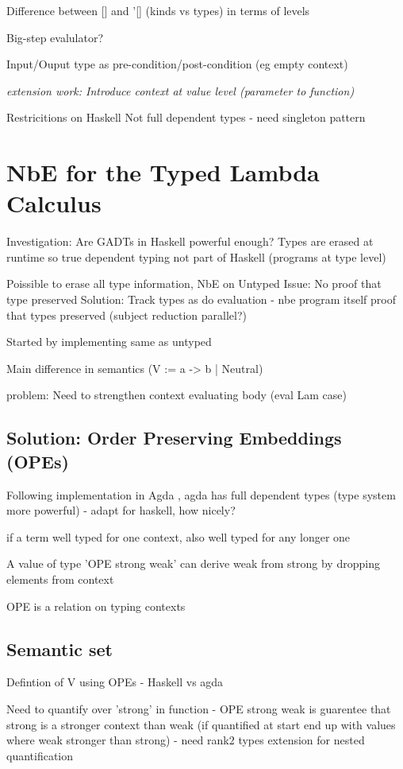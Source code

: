 \documentclass{article}
\begin{document}
Difference between [] and '[] (kinds vs types) in terms of levels

Big-step evalulator?

Input/Ouput type as pre-condition/post-condition (eg empty context)

\textit{extension work: Introduce context at value level (parameter to function)} 

Restricitions on Haskell
Not full dependent types - need singleton pattern

\section{NbE for the Typed Lambda Calculus}
Investigation: Are GADTs in Haskell powerful enough? Types are erased at runtime so true dependent typing not part of Haskell (programs at type level)

Poissible to erase all type information, NbE on Untyped
Issue: No proof that type preserved 
Solution: Track types as do evaluation - nbe program itself proof that types preserved (subject reduction parallel?)

Started by implementing same as untyped

Main difference in semantics (V := a -> b | Neutral) 
\cite{slides}

problem: Need to strengthen context evaluating body (eval Lam case)
\subsection{Solution: Order Preserving Embeddings (OPEs)}

Following implementation in Agda \cite{AgdaNbe}, agda has full dependent types (type system more powerful) - adapt for haskell, how nicely? 

if a term well typed for one context, also well typed for any longer one

A value of type 'OPE strong weak' can derive weak from strong by dropping elements from context

OPE is a relation on typing contexts

\subsection{Semantic set}

Defintion of V using OPEs - Haskell vs agda

Need to quantify over 'strong' in function - OPE strong weak is guarentee that strong is a stronger context than weak (if quantified at start end up with values where weak stronger than strong) - need rank2 types extension for nested quantification
\end{document}
